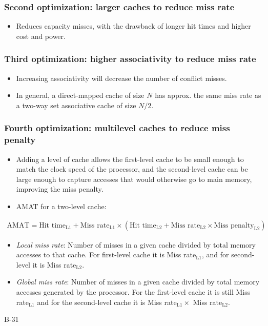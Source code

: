 \subsubsection{Second optimization: larger caches to reduce miss rate} 
\begin{itemize}
  \item Reduces capacity misses, with the drawback of longer hit times and higher cost and power.
\end{itemize}
\subsubsection{Third optimization: higher associativity to reduce miss rate}
\begin{itemize}
  \item Increasing associativity will decrease the number of conflict misses.
  \item In general, a direct-mapped cache of size $N$ has approx. the same miss rate as a two-way set associative cache of size $N/2$.
\end{itemize}
\subsubsection{Fourth optimization: multilevel caches to reduce miss penalty}
\begin{itemize}
  \item Adding a level of cache allows the first-level cache to be small enough to match the clock speed of the processor, and the second-level cache can be large enough to capture accesses that would otherwise go to main memory, improving the miss penalty.
  \item AMAT for a two-level cache:
\end{itemize}
\begin{align}
\text{AMAT}=\text{Hit time}_\text{L1} + \text{Miss rate}_\text{L1} \times (\text{Hit time}_\text{L2} + \text{Miss rate}_\text{L2} \times \text{Miss penalty}_\text{L2})
\end{align}
\begin{itemize}
  \item \textit{Local miss rate}: Number of misses in a given cache divided by total memory accesses to that cache. For first-level cache it is Miss rate$_\text{L1}$, and for second-level it is Miss rate$_\text{L2}$.
  \item \textit{Global miss rate}: Number of misses in a given cache divided by total memory accesses generated by the processor. For the first-level cache it is still Miss rate$_\text{L1}$ and for the second-level cache it is Miss rate$_\text{L1} \times$ Miss rate$_\text{L2}$.
\end{itemize}
B-31

